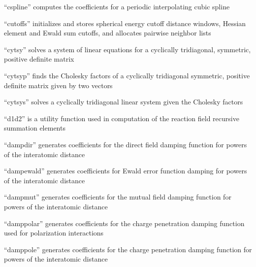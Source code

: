 \documentclass[letterpaper,11pt,english]{sphinxmanual}
\begin{document}

“cspline” computes the coefficients for a periodic interpolating
cubic spline


“cutoffs” initializes and stores spherical energy cutoff
distance windows, Hessian element and Ewald sum cutoffs,
and allocates pairwise neighbor lists


“cytsy” solves a system of linear equations for a cyclically
tridiagonal, symmetric, positive definite matrix


“cytsyp” finds the Cholesky factors of a cyclically tridiagonal
symmetric, positive definite matrix given by two vectors


“cytsys” solves a cyclically tridiagonal linear system
given the Cholesky factors


“d1d2” is a utility function used in computation of the
reaction field recursive summation elements


“dampdir” generates coefficients for the direct field damping
function for powers of the interatomic distance


“dampewald” generates coefficients for Ewald error function
damping for powers of the interatomic distance


“dampmut” generates coefficients for the mutual field damping
function for powers of the interatomic distance


“damppolar” generates coefficients for the charge penetration
damping function used for polarization interactions


“damppole” generates coefficients for the charge penetration
damping function for powers of the interatomic distance

\end{document}
